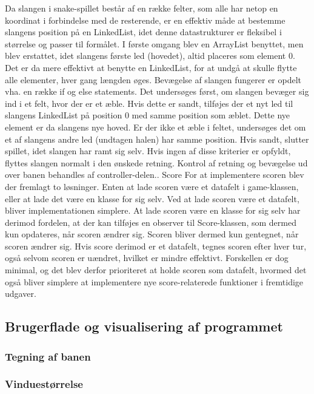 \documentclass{report}
\begin{document}
Da slangen i snake-spillet består af en række felter, som alle har netop en koordinat i forbindelse med de resterende, er en effektiv måde at bestemme slangens position på en LinkedList, idet denne datastrukturer er fleksibel i størrelse og passer til formålet. I første omgang blev en ArrayList benyttet, men blev erstattet, idet slangens første led (hovedet), altid placeres som element 0. Det er da mere effektivt at benytte en LinkedList, for at undgå at skulle flytte alle elementer, hver gang længden øges.
Bevægelse af slangen fungerer er opdelt vha. en række if og else statements. Det undersøges først, om slangen bevæger sig ind i et felt, hvor der er et æble. Hvis dette er sandt, tilføjes der et nyt led til slangens LinkedList på position 0 med samme position som æblet. Dette nye element er da slangens nye hoved. Er der ikke et æble i feltet, undersøges det om et af slangens andre led (undtagen halen) har samme position. Hvis sandt, slutter spillet, idet slangen har ramt sig selv. Hvis ingen af disse kriterier er opfyldt, flyttes slangen normalt i den ønskede retning. Kontrol af retning og bevægelse ud over banen behandles af controller-delen..
Score
For at implementere scoren blev der fremlagt to løsninger. Enten at lade scoren være et datafelt i game-klassen, eller at lade det være en klasse for sig selv. Ved at lade scoren være et datafelt, bliver implementationen simplere. At lade scoren være en klasse for sig selv har derimod fordelen, at der kan 
tilføjes en observer til Score-klassen, som dermed kun opdateres, når scoren ændrer sig. Scoren bliver dermed kun gentegnet, når scoren ændrer sig. Hvis score derimod er et datafelt, tegnes scoren efter hver tur, også selvom scoren er uændret, hvilket er mindre effektivt. Forskellen er dog minimal, og det blev derfor prioriteret at holde scoren som datafelt, hvormed det også bliver simplere at implementere nye score-relaterede funktioner i fremtidige udgaver.

\subsection{Brugerflade og visualisering af programmet}

\subsubsection{Tegning af banen}

\subsubsection{Vinduestørrelse}
\end{document}
